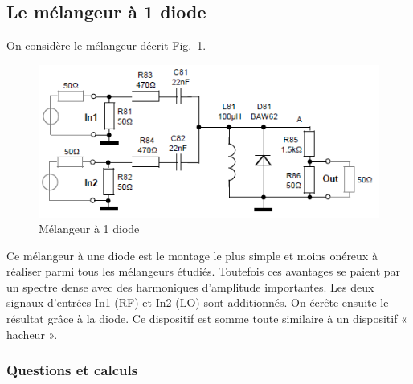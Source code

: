 \documentclass{article}
\begin{document}
%
%
%
%


\subsection{Le mélangeur à 1 diode}

On considère le mélangeur décrit Fig.~\ref{fig:schema_melangeur_diode}.
\begin{figure}[h!]
	\centering
	\includegraphics[width=.7\textwidth]{schema_melangeur_diode}
	\caption{Mélangeur à 1 diode}
	\label{fig:schema_melangeur_diode}
\end{figure}

Ce mélangeur à une diode est le montage le plus simple et moins onéreux à réaliser parmi tous les mélangeurs étudiés. Toutefois ces avantages se paient par un spectre dense avec des harmoniques d'amplitude importantes.
Les deux signaux d'entrées In1 (RF) et In2 (LO) sont additionnés. On écrête ensuite le résultat grâce à la diode.
Ce dispositif est somme toute similaire à un dispositif « hacheur ».

\subsubsection{Questions et calculs}

\end{document}
